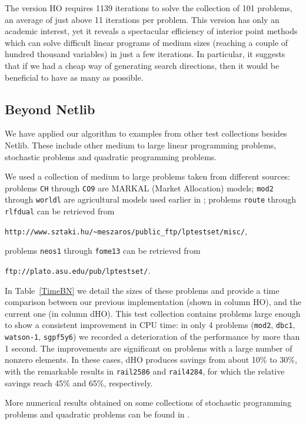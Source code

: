 The version HO\raisebox{1pt}{-$\infty$} requires 1139 iterations to solve 
the collection of 101 problems, an average of just above 11 iterations
per problem. This version has only an academic interest, 
yet it reveals a spectacular efficiency of interior point 
methods which can solve difficult linear programs of medium sizes 
(reaching a couple of hundred thousand variables) in just 
a few iterations.
In particular, it suggests that if we had a cheap way of generating
search directions, then it would be beneficial to have as many as possible.

%
%
\subsection{Beyond Netlib}
\label{BN-tests}

We have applied our algorithm to examples from other test collections 
besides Netlib.
These include other medium to large linear programming problems, 
stochastic problems and quadratic programming problems.

We used a collection of medium to large problems taken from different
sources: problems {\tt CH} through {\tt CO9}
are MARKAL (Market Allocation) models; {\tt mod2} through {\tt worldl} are
agricultural models used earlier in \cite{Gondzio96}; problems {\tt route}
through {\tt rlfdual} can be retrieved from 
\begin{center}
{\tt http://www.sztaki.hu/\~{}meszaros/public\_ftp/lptestset/misc/},
\end{center}
problems {\tt neos1} through {\tt fome13} can be retrieved from 
\begin{center}
{\tt ftp://plato.asu.edu/pub/lptestset/}.
\end{center}

In Table~\ref{TimeBN} we detail the sizes of these problems and provide 
a time comparison between our previous implementation (shown in column
HO), and the current one (in column dHO).
This test collection contains problems large enough 
to show a consistent improvement in CPU time: in only 4 problems 
({\tt mod2}, {\tt dbc1}, {\tt watson-1}, {\tt sgpf5y6}) 
we recorded a deterioration of the performance by more than 1 second.
The improvements are significant on problems with a large 
number of nonzero elements. In these cases, dHO
produces savings from about 10\% to 30\%, with the remarkable results
in {\tt rail2586} and {\tt rail4284}, for which the relative savings 
reach 45\% and 65\%, respectively.

More numerical results obtained on some collections of stochastic
programming problems and quadratic problems can be found in
\cite{ColomboGondzio05}.

